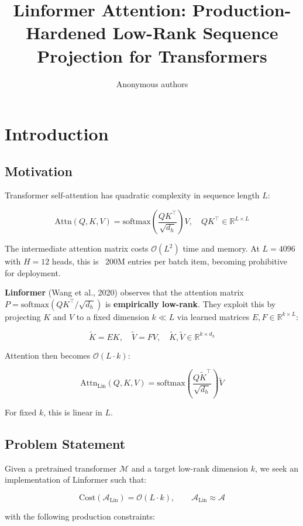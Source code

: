 \title{\textbf{Linformer Attention: Production-Hardened Low-Rank Sequence Projection for Transformers}}

\author{Anonymous authors}


\section{Introduction}

\subsection{Motivation}

Transformer self-attention has quadratic complexity in sequence length $L$:

\[
\text{Attn}(Q, K, V) = \text{softmax}\!\left(\frac{Q K^\top}{\sqrt{d_h}}\right) V, 
\quad QK^\top \in \mathbb{R}^{L \times L}
\tag{1.1}
\]

The intermediate attention matrix costs $\mathcal{O}(L^2)$ time and memory. 
At $L = 4096$ with $H = 12$ heads, this is ~200M entries per batch item, 
becoming prohibitive for deployment.

\textbf{Linformer} (Wang et al., 2020) observes that the attention matrix 
$P = \text{softmax}(QK^\top/\sqrt{d_h})$ is \textbf{empirically low-rank}. They 
exploit this by projecting $K$ and $V$ to a fixed dimension $k \ll L$ via 
learned matrices $E, F \in \mathbb{R}^{k \times L}$:

\[
\tilde{K} = E K, \quad \tilde{V} = F V, \quad \tilde{K}, \tilde{V} \in \mathbb{R}^{k \times d_h}
\tag{1.2}
\]

Attention then becomes $\mathcal{O}(L \cdot k)$:

\[
\text{Attn}_\text{Lin}(Q, K, V) = \text{softmax}\!\left(\frac{Q \tilde{K}^\top}{\sqrt{d_h}}\right) \tilde{V}
\tag{1.3}
\]

For fixed $k$, this is linear in $L$.

\subsection{Problem Statement}

Given a pretrained transformer $\mathcal{M}$ and a target low-rank dimension 
$k$, we seek an implementation of Linformer such that:

\[
\text{Cost}(\mathcal{A}_\text{Lin}) = \mathcal{O}(L \cdot k), \qquad
\mathcal{A}_\text{Lin} \approx \mathcal{A}
\tag{1.4}
\]

with the following production constraints:

